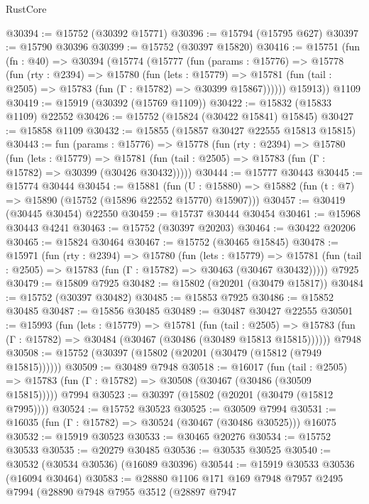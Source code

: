 \begin{lexlean}{RustCore}
\begin{coremodule}
@30394 := @15752 (@30392 @15771)
@30396 := @15794 (@15795 @627)
@30397 := @15790 @30396
@30399 := @15752 (@30397 @15820)
@30416 := @15751
    (fun (fn : @40) =>
    @30394
      (@15774
        (@15777
          (fun (params : @15776) =>
          @15778
            (fun (rty : @2394) =>
            @15780
              (fun (lets : @15779) =>
              @15781 (fun (tail : @2505) => @15783 (fun (Γ : @15782) => @30399 @15867))))))
        @15913))
    @1109
@30419 := @15919 (@30392 (@15769 @1109))
@30422 := @15832 (@15833 @1109) @22552
@30426 := @15752 (@15824 (@30422 @15841) @15845)
@30427 := @15858 @1109
@30432 := @15855 (@15857 @30427 @22555 @15813 @15815)
@30443 := fun (params : @15776) =>
  @15778
    (fun (rty : @2394) =>
    @15780
      (fun (lets : @15779) =>
      @15781 (fun (tail : @2505) => @15783 (fun (Γ : @15782) => @30399 (@30426 @30432)))))
@30444 := @15777 @30443
@30445 := @15774 @30444
@30454 := @15881
    (fun (U : @15880) => @15882 (fun (t : @7) => @15890 (@15752 (@15896 @22552 @15770) @15907)))
@30457 := @30419 (@30445 @30454) @22550
@30459 := @15737 @30444 @30454
@30461 := @15968 @30443 @4241
@30463 := @15752 (@30397 @20203)
@30464 := @30422 @20206
@30465 := @15824 @30464
@30467 := @15752 (@30465 @15845)
@30478 := @15971
    (fun (rty : @2394) =>
    @15780
      (fun (lets : @15779) =>
      @15781 (fun (tail : @2505) => @15783 (fun (Γ : @15782) => @30463 (@30467 @30432)))))
    @7925
@30479 := @15809 @7925
@30482 := @15802 (@20201 (@30479 @15817))
@30484 := @15752 (@30397 @30482)
@30485 := @15853 @7925
@30486 := @15852 @30485
@30487 := @15856 @30485
@30489 := @30487 @30427 @22555
@30501 := @15993
    (fun (lets : @15779) =>
    @15781
      (fun (tail : @2505) =>
      @15783 (fun (Γ : @15782) => @30484 (@30467 (@30486 (@30489 @15813 @15815))))))
    @7948
@30508 := @15752 (@30397 (@15802 (@20201 (@30479 (@15812 (@7949 @15815))))))
@30509 := @30489 @7948
@30518 := @16017
    (fun (tail : @2505) => @15783 (fun (Γ : @15782) => @30508 (@30467 (@30486 (@30509 @15815)))))
    @7994
@30523 := @30397 (@15802 (@20201 (@30479 (@15812 @7995))))
@30524 := @15752 @30523
@30525 := @30509 @7994
@30531 := @16035 (fun (Γ : @15782) => @30524 (@30467 (@30486 @30525))) @16075
@30532 := @15919 @30523
@30533 := @30465 @20276
@30534 := @15752 @30533
@30535 := @20279 @30485
@30536 := @30535 @30525
@30540 := @30532 (@30534 @30536) (@16089 @30396)
@30544 := @15919 @30533 @30536 (@16094 @30464)
@30583 := @28880
    @1106
    @171
    @169
    @7948
    @7957
    @2495
    @7994
    (@28890
      @7948
      @7955
      @3512
      (@28897
        @7947

\end{coremodule}
\end{lexlean}

